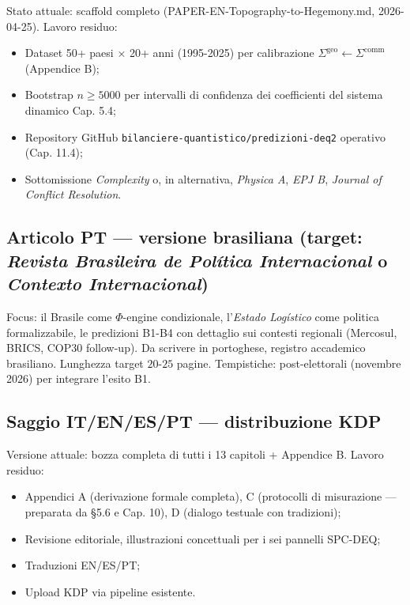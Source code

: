Stato attuale: scaffold completo (PAPER-EN-Topography-to-Hegemony.md,
2026-04-25). Lavoro residuo:

\begin{itemize}
\tightlist
\item
  Dataset 50+ paesi $\times$ 20+ anni (1995-2025) per calibrazione
  \(\Sigma^{\text{geo}} \leftarrow \Sigma^{\text{comm}}\) (Appendice B);
\item
  Bootstrap \(n \geq 5000\) per intervalli di confidenza dei
  coefficienti del sistema dinamico Cap. 5.4;
\item
  Repository GitHub \texttt{bilanciere-quantistico/predizioni-deq2}
  operativo (Cap. 11.4);
\item
  Sottomissione \emph{Complexity} o, in alternativa, \emph{Physica A},
  \emph{EPJ B}, \emph{Journal of Conflict Resolution}.
\end{itemize}

\subsection{\texorpdfstring{Articolo PT --- versione brasiliana (target:
\emph{Revista Brasileira de Política Internacional} o \emph{Contexto
Internacional})}{Articolo PT --- versione brasiliana (target: Revista Brasileira de Política Internacional o Contexto Internacional)}}\label{articolo-pt-versione-brasiliana-target-revista-brasileira-de-poluxedtica-internacional-o-contexto-internacional}

Focus: il Brasile come \(\Phi\)-engine condizionale, l'\emph{Estado
Logístico} come politica formalizzabile, le predizioni B1-B4 con
dettaglio sui contesti regionali (Mercosul, BRICS, COP30 follow-up). Da
scrivere in portoghese, registro accademico brasiliano. Lunghezza target
\(20\)-\(25\) pagine. Tempistiche: post-elettorali (novembre 2026) per
integrare l'esito B1.

\subsection{Saggio IT/EN/ES/PT --- distribuzione
KDP}\label{saggio-itenespt-distribuzione-kdp}

Versione attuale: bozza completa di tutti i 13 capitoli + Appendice B.
Lavoro residuo:

\begin{itemize}
\tightlist
\item
  Appendici A (derivazione formale completa), C (protocolli di
  misurazione --- preparata da \S{}5.6 e Cap. 10), D (dialogo testuale con
  tradizioni);
\item
  Revisione editoriale, illustrazioni concettuali per i sei pannelli
  SPC-DEQ;
\item
  Traduzioni EN/ES/PT;
\item
  Upload KDP via pipeline esistente.
\end{itemize}



